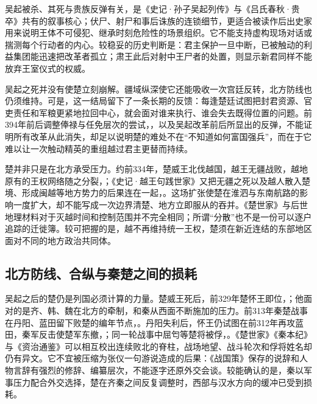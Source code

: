 \begin{debate}[丧礼场景说得有多实]
吴起被杀、其死与贵族反弹有关，是《史记·孙子吴起列传》与《吕氏春秋·贵卒》共有的叙事核心；伏尸、射尸和事后诛族的连锁细节，更适合被读作后出史家用来说明王体不可侵犯、继承时刻危险性的场景组织。它不能支持虚构现场对话或揣测每个行动者的内心。较稳妥的历史判断是：君主保护一旦中断，已被触动的利益集团能迅速把改革者孤立；肃王此后对射中王尸者的处置，则显示新君同样不能放弃王室仪式的权威。
\end{debate}

吴起之死并没有使楚立刻崩解。疆域纵深使它还能吸收一次宫廷反转，北方防线也仍须维持。可是，这一结局留下了一条长期的反馈：每逢楚廷试图把封君资源、官吏责任和军粮更紧地拉回中心，就会面对谁来执行、谁会失去既得位置的问题。前394年前后调整俸禄与任免层次的尝试，，以及吴起改革前后所显出的反弹，不能证明所有改革从此消失，却足以说明楚的难处不在“不知道如何富国强兵”，而在于它难以让一次触动精英的重组越过君主更替而持续。

楚并非只是在北方承受压力。约前334年，楚威王北伐越国，越王无疆战败，越地原有的王权网络随之分裂，；《史记·越王句践世家》又把无疆之死以及越人散入楚境、形成闽越等地方势力的后果连在一起，。这场扩张使楚在淮泗与东南航路的影响一度扩大，却不能写成一次边界清楚、地方立即服从的吞并。《楚世家》与后世地理材料对于灭越时间和控制范围并不完全相同；所谓“分散”也不是一份可以逐户追踪的迁徙簿。较可把握的是，越不再维持统一王权，楚须在新近连结的东部地区面对不同的地方政治共同体。

\subsection{北方防线、合纵与秦楚之间的损耗}

吴起之后的楚仍是列国必须计算的力量。楚威王死后，前329年楚怀王即位，；他面对的是齐、韩、魏在北方的牵制，和秦从西面不断施加的压力。前313年秦楚战事在丹阳、蓝田留下败楚的编年节点，。丹阳失利后，怀王仍试图在前312年再攻蓝田，秦军反击使楚军东撤，；同一轮战事中屈匄等楚将被俘，。《楚世家》《秦本纪》与《资治通鉴》可以相互校出连续败北的脊柱，战场地望、战斗轮次和俘将姓名却仍有异文。它不宜被压缩为张仪一句游说造成的后果：《战国策》保存的说辞和人物言辞有强烈的修辞、编纂层次，不能逐字还原外交会谈。较能确认的是，秦以军事压力配合外交选择，楚在齐秦之间反复调整时，西部与汉水方向的缓冲已受到损耗。

